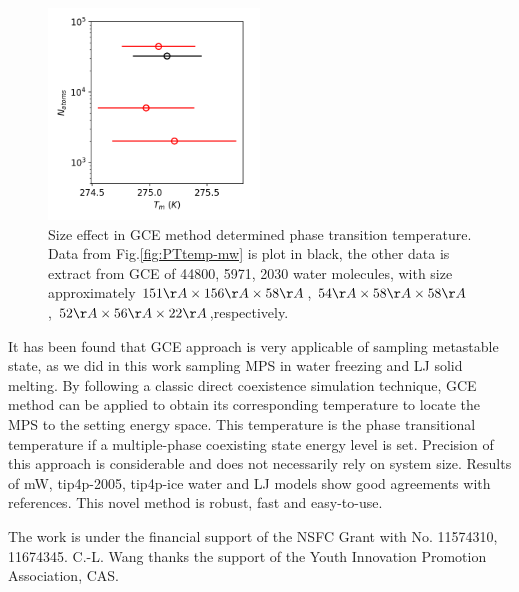 \documentclass[aps,prl,twocolumn,superscriptaddress]{revtex4-1}
\begin{document}
\begin{figure}[ht]
\centering{}\includegraphics[width=0.5\textwidth]{size_effect.png} 
\caption{Size effect in GCE method determined phase transition temperature. Data from Fig.\ref{fig:PTtemp-mw} is plot in black, the other data is extract from GCE of 44800, 5971, 2030 water molecules, with size approximately $151\AA \times  156 \AA \times  58 \AA$, $54 \AA \times  58 \AA \times  58 \AA$, $52\AA \times  56 \AA \times  22\AA$,respectively.
\label{fig:sizeeffect}} 
\end{figure}
 
It has been found that GCE approach is very applicable of sampling metastable state, as we did in this work sampling MPS in water freezing and LJ solid melting. By following a classic direct coexistence simulation technique, GCE method can be applied to obtain its corresponding temperature to locate the MPS to the setting energy space. This temperature is the phase transitional temperature if a multiple-phase coexisting state energy level is set. Precision of this approach is considerable and does not necessarily rely on system size. Results of mW, tip4p-2005, tip4p-ice water and LJ models show good agreements with references. This novel method is robust, fast and easy-to-use.
    
The work is under the financial support of the NSFC Grant with No. 11574310, 11674345. C.-L. Wang thanks the support of the Youth Innovation Promotion Association, CAS. 



\end{document}
